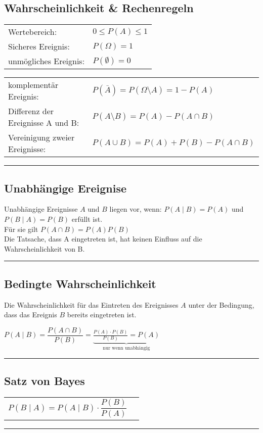 \subsection{Wahrscheinlichkeit \& Rechenregeln }
\begin{tabular}{ll}
  Wertebereich:         & ${0}\le{P(A)}\le{1}$\\
  Sicheres Ereignis:    & $P(\Omega)=1$\\
  unmögliches Ereignis: & $P(\emptyset)=0$
\end{tabular}
		\begin{tabular}{ll}
			komplementär Ereignis:
			&$P(\bar{A})=P({\Omega}\setminus{A})=1-P(A)$\\
			Differenz der Ereignisse A und B:
			&$P({A}\setminus{B})=P(A)-P({A}\cap{B})$\\
			Vereinigung zweier Ereignisse:
			&$P({A}\cup{B})=P(A)+P(B)-P({A}\cap{B})$
		\end{tabular}
\hrule

\subsection{Unabhängige Ereignise  }
		Unabhängige Ereignisse $A$ und $B$ liegen vor, wenn: \hspace*{5mm} $P(A\mid
		B)=P(A)$ \hspace{4mm} und \hspace{4mm} $P(B\mid A)=P(B)$ \hspace*{5mm} erfüllt
		ist. \\
		Für sie gilt \hspace*{5mm} $P(A\cap B)=P(A)P(B)$\\
    	Die Tatsache, dass A eingetreten ist, hat keinen Einfluss auf die 
		Wahrscheinlichkeit von B.\\
\hrule

\subsection{Bedingte Wahrscheinlichkeit  }
Die Wahrscheinlichkeit für das Eintreten des Ereignisses $A$ unter der
Bedingung, dass das Ereignis $B$ bereits eingetreten ist.
\begin{center}
  $P(A\mid B)= \dfrac{P(A\cap B)}{P(B)}=\underbrace{\frac{P(A)\cdot
  P(B)}{P(B)}=P(A)}_{\text{nur wenn unabhängig}}$
\end{center}
\hrule

\subsection{Satz von Bayes  }
\begin{tabular}{ll}
  $P(B\mid A)=P(A\mid B) \cdot\dfrac{P(B)}{P(A)}$
  \vspace{1mm}
\end{tabular}
\hrule


